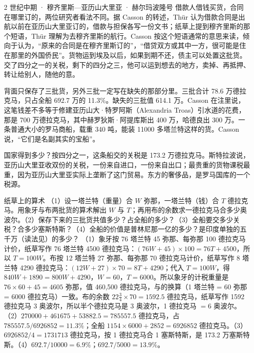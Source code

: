 \begin{case}{2 世纪中期 · 穆齐里斯—亚历山大里亚 · 赫尔玛波隆号}
借款人借钱买货，合同在哪里订的，两位研究者看法不同。据 Casson 的转述，Thür 认为借款合同是出航以前在亚历山大里亚订的，借款与担保各写一份文书；纸草上提到穆齐里斯的那个短语，Thür 理解为去穆齐里斯的航行。Casson 按这个短语通常的意思来读，倾向于认为，“原来的合同是在穆齐里斯订的”，“借贷双方或其中一方，很可能是住在那里的外国侨民”\cite{casson1990}。货物运到埃及以后，如果到期不还，债主可以处置这批货。交了四分之一的关税，剩下的四分之三，他可以运到想去的地方，卖掉、再抵押、转让给别人，随他的意\cite{casson1990}。

背面只保存了三批货，另外三批一定写在缺失的那部分里\cite{casson1990}。三批合计 78.6 万德拉克马，只占全船 692.7 万的 11.3\%。缺失的三批值 614.1 万。Casson 在注里说，这笔钱差不多等于修建亚历山大·特罗阿斯（Alexandria Troas）引水道的花费，那是 700 万德拉克马，其中赫罗狄斯·阿提库斯出 400 万，哈德良出 300 万。一条普通大小的罗马商船，载重 340 吨，能装 11000 多塔兰特这样的货。Casson 说，“它们是名副其实的宝船”\cite{casson1990}。

国家得到多少？按四分之一，这条船交的关税是 173.2 万德拉克马。斯特拉波说，亚历山大里亚收双份的关税，一份来自进口，一份来自出口；最贵重的货物课税最重，因为亚历山大里亚实际上垄断了这门贸易\cite{strabo}。东方的奢侈品，是罗马国库的一个税源。
\end{case}

\begin{example}{纸草上的算术}\label{ex:india-cargo}
（1）设一塔兰特（重量）合 $W$ 弥那，一塔兰特（钱）合 $T$ 德拉克马。用象牙与布两批货的算术解出 $W$ 与 $T$；再用布的余数求一德拉克马合多少奥波尔。（2）保存下来的三批货共值多少？占全船的多少？（3）全船要交多少关税？合多少塞斯特斯？（4）全船的价值是普林尼那一亿的多少？是印度单独的五千万（读法见）的多少？
\solution （1）象牙按 76 塔兰特 45 弥那、每弥那 100 德拉克马计价，纸草写作 76 塔兰特 4500 德拉克马：$(76W+45)\times100=76T+4500$，所以 $T=100W$。布按 12 塔兰特 27 弥那、每弥那 70 德拉克马计价，纸草写作 8 塔兰特 4290 德拉克马：$(12W+27)\times70=8T+4290$；代入 $T=100W$，得 $840W+1890=800W+4290$，$W=60$，$T=6000$。所以象牙的计税重量是 $76\times60+45=4605$ 弥那，值 460,500 德拉克马，与的换算（1 塔兰特 = 60 弥那 = 6000 德拉克马）一致。布的余数 $22\tfrac34\times70=1592.5$ 德拉克马，纸草写作 1592 德拉克马 3 奥波尔，所以半个德拉克马是 3 奥波尔，1 德拉克马 $=6$ 奥波尔。（2）$270000+461675+53882.5=785557.5$ 德拉克马，占 $785557.5/6926852=11.3\%$；全船 $1154\times6000+2852=6926852$ 德拉克马。（3）$6926852/4=1731713$ 德拉克马，按 1 德拉克马合 1 塞斯特斯，是 173.2 万塞斯特斯。（4）$692.7/10000=6.9\%$；$692.7/5000=13.9\%$。
\end{example}

